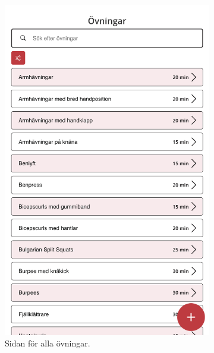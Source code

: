 \documentclass{article}
\begin{document}
{\begin{figure}[h!]
{\begin{subfigure}[b]{0.3\textwidth}
                 \includegraphics[width=\textwidth]{images/Screens/Exercise.png}
                 \caption{Sidan för alla övningar.}
                 \label{fig:exercise}
            \end{subfigure}
            \hfill
            \begin{subfigure}[b]{0.3\textwidth}
                 \centering

\end{subfigure}}
\end{figure}}
\end{document}
